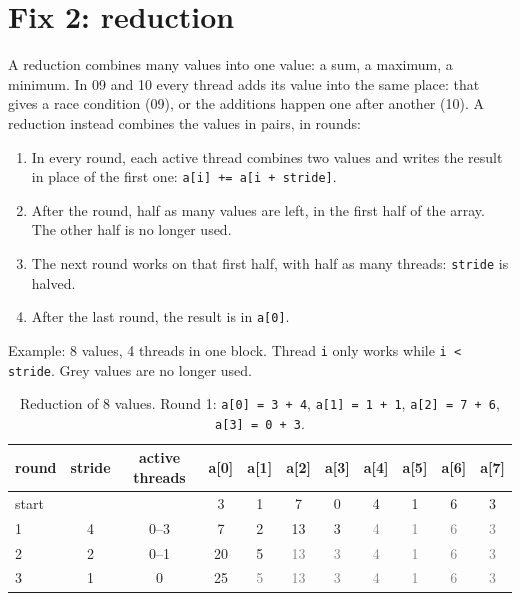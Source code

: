 \documentclass[main.tex]{subfiles}
\begin{document}
\section{Fix 2: reduction}
\label{sec:reduction}

A reduction combines many values into one value: a sum, a maximum, a minimum.
In 09 and 10 every thread adds its value into the same place: that gives a race condition (09), or the additions happen one after another (10).
A reduction instead combines the values in pairs, in rounds:
\begin{enumerate}[nosep]
  \item In every round, each active thread combines two values and writes the result in place of the first one: \texttt{a[i] += a[i + stride]}.
  \item After the round, half as many values are left, in the first half of the array. The other half is no longer used.
  \item The next round works on that first half, with half as many threads: \texttt{stride} is halved.
  \item After the last round, the result is in \texttt{a[0]}.
\end{enumerate}

Example: 8 values, 4 threads in one block. Thread \texttt{i} only works while \texttt{i < stride}. Grey values are no longer used.

\begin{table}[H]
\centering
\begin{tabular}{l|c|c|cccccccc}
round & stride & active threads & a[0] & a[1] & a[2] & a[3] & a[4] & a[5] & a[6] & a[7] \\ \hline
start &   &       & 3  & 1 & 7  & 0 & 4 & 1 & 6 & 3 \\
1     & 4 & 0--3  & 7  & 2 & 13 & 3 & \textcolor{gray}{4} & \textcolor{gray}{1} & \textcolor{gray}{6} & \textcolor{gray}{3} \\
2     & 2 & 0--1  & 20 & 5 & \textcolor{gray}{13} & \textcolor{gray}{3} & \textcolor{gray}{4} & \textcolor{gray}{1} & \textcolor{gray}{6} & \textcolor{gray}{3} \\
3     & 1 & 0     & 25 & \textcolor{gray}{5} & \textcolor{gray}{13} & \textcolor{gray}{3} & \textcolor{gray}{4} & \textcolor{gray}{1} & \textcolor{gray}{6} & \textcolor{gray}{3} \\
\end{tabular}
\caption{Reduction of 8 values. Round 1: \texttt{a[0] = 3 + 4}, \texttt{a[1] = 1 + 1}, \texttt{a[2] = 7 + 6}, \texttt{a[3] = 0 + 3}.}
\end{table}
\end{document}
